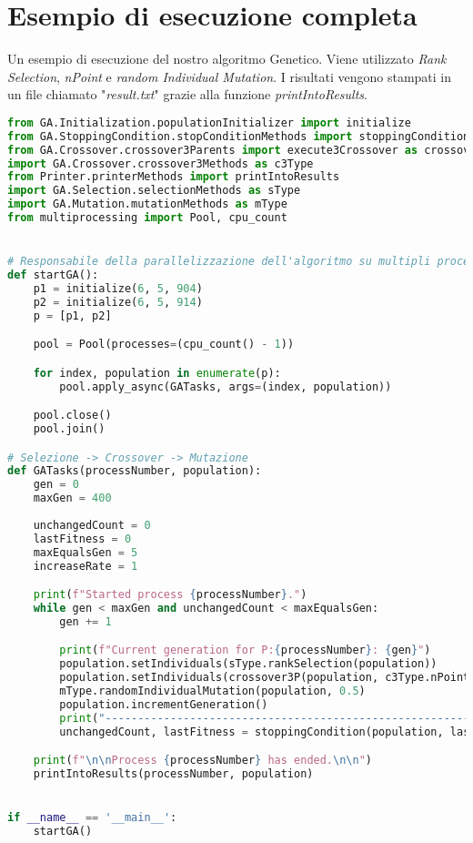 \documentclass{article}
\begin{document}
\section{Esempio di esecuzione completa}
Un esempio di esecuzione del nostro algoritmo Genetico. Viene utilizzato \textit{Rank Selection}, \textit{nPoint} e \textit{random Individual Mutation}. I risultati vengono stampati in un file chiamato "\textit{result.txt}" grazie alla funzione \textit{printIntoResults}.
\begin{lstlisting}[language = Python]
from GA.Initialization.populationInitializer import initialize
from GA.StoppingCondition.stopConditionMethods import stoppingCondition
from GA.Crossover.crossover3Parents import execute3Crossover as crossover3P
import GA.Crossover.crossover3Methods as c3Type
from Printer.printerMethods import printIntoResults
import GA.Selection.selectionMethods as sType
import GA.Mutation.mutationMethods as mType
from multiprocessing import Pool, cpu_count


# Responsabile della parallelizzazione dell'algoritmo su multipli processi
def startGA():
    p1 = initialize(6, 5, 904)
    p2 = initialize(6, 5, 914)
    p = [p1, p2]

    pool = Pool(processes=(cpu_count() - 1))

    for index, population in enumerate(p):
        pool.apply_async(GATasks, args=(index, population))

    pool.close()
    pool.join()

# Selezione -> Crossover -> Mutazione
def GATasks(processNumber, population):
    gen = 0
    maxGen = 400
    
    unchangedCount = 0
    lastFitness = 0
    maxEqualsGen = 5
    increaseRate = 1

    print(f"Started process {processNumber}.")
    while gen < maxGen and unchangedCount < maxEqualsGen:
        gen += 1

        print(f"Current generation for P:{processNumber}: {gen}")
        population.setIndividuals(sType.rankSelection(population))
        population.setIndividuals(crossover3P(population, c3Type.nPoint, 2))
        mType.randomIndividualMutation(population, 0.5)
        population.incrementGeneration()
        print("--------------------------------------------------------------------")
        unchangedCount, lastFitness = stoppingCondition(population, lastFitness, unchangedCount, increaseRate)

    print(f"\n\nProcess {processNumber} has ended.\n\n")
    printIntoResults(processNumber, population)


if __name__ == '__main__':
    startGA()
\end{lstlisting}
\end{document}
